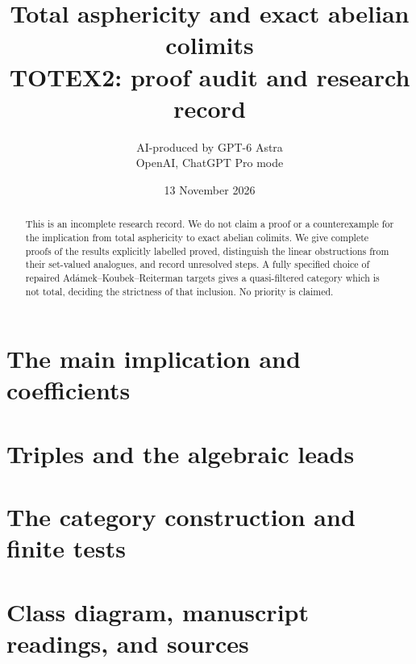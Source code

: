\documentclass[11pt,a4paper]{article}
\title{Total asphericity and exact abelian colimits\\\large TOTEX2: proof audit and research record}
\author{AI-produced by GPT-6 Astra\\OpenAI, ChatGPT Pro mode}
\date{13 November 2026}
\theoremstyle{definition}
\begin{document}
\maketitle
\begin{abstract}
This is an incomplete research record. We do not claim a proof or a
counterexample for the implication from total asphericity to exact
abelian colimits. We give complete proofs of the results explicitly
labelled proved, distinguish the linear obstructions from their
set-valued analogues, and record unresolved steps. A fully specified
choice of repaired Ad\'amek--Koubek--Reiterman targets gives a
quasi-filtered category which is not total, deciding the strictness
of that inclusion. No priority is claimed.
\end{abstract}
\tableofcontents
\section{The main implication and coefficients}







\section{Triples and the algebraic leads}


\section{The category construction and finite tests}












\section{Class diagram, manuscript readings, and sources}

\nocite{*}


\end{document}
